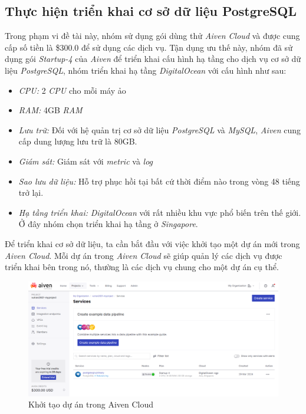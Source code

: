 \subsection{Thực hiện triển khai cơ sở dữ liệu PostgreSQL}
\hspace*{1cm}
Trong phạm vi đề tài này, nhóm sử dụng gói dùng thử \textit{Aiven Cloud} và được cung cấp số tiền là \$300.0 để sử dụng các dịch vụ. Tận dụng ưu thế này, nhóm đã sử dụng gói \textit{Startup-4} của \textit{Aiven} để triển khai cấu hình hạ tầng cho dịch vụ cơ sở dữ liệu \textit{PostgreSQL}, nhóm triển khai hạ tầng \textit{DigitalOcean} với cấu hình như sau:
\begin{itemize}
    \item \textit{CPU:} 2 \textit{CPU} cho mỗi máy ảo
    \item \textit{RAM:} 4GB \textit{RAM}
    \item \textit{Lưu trữ:} Đối với hệ quản trị cơ sở dữ liệu \textit{PostgreSQL} và \textit{MySQL}, \textit{Aiven} cung cấp dung lượng lưu trữ là 80GB.
    \item \textit{Giám sát:} Giám sát với \textit{metric} và \textit{log}
    \item \textit{Sao lưu dữ liệu:} Hỗ trợ phục hồi tại bất cứ thời điểm nào trong vòng 48 tiếng trở lại.
    \item \textit{Hạ tầng triển khai:} \textit{DigitalOcean} với rất nhiều khu vực phổ biến trên thế giới. Ở đây nhóm chọn triển khai hạ tầng ở \textit{Singapore}.
\end{itemize}
\hspace*{1cm}
Để triển khai cơ sở dữ liệu, ta cần bắt đầu với việc khởi tạo một dự án mới trong \textit{Aiven Cloud}. Mỗi dự án trong \textit{Aiven Cloud} sẽ giúp quản lý các dịch vụ được triển khai bên trong nó, thường là các dịch vụ chung cho một dự án cụ thể.
\begin{figure}[H]
    \centering
    \includegraphics[width=1\textwidth]{Images/Deployment/Database/AivenProject.png}
    \caption{Khởi tạo dự án trong Aiven Cloud}
\end{figure}
